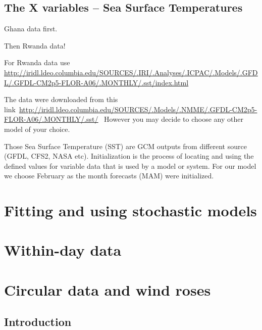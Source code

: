 \documentclass[
  letterpaper,
  DIV=11,
  numbers=noendperiod]{scrreprt}
\begin{document}
\section{The X variables -- Sea Surface
Temperatures}\label{the-x-variables-sea-surface-temperatures}

Ghana data first.

Then Rwanda data!

For Rwanda data use
\href{http://iridl.ldeo.columbia.edu/SOURCES/.IRI/.Analyses/.ICPAC/.Models/.GFDL/.GFDL-CM2p5-FLOR-A06/.MONTHLY/.sst/index.html}{\ul{http://iridl.ldeo.columbia.edu/SOURCES/.IRI/.Analyses/.ICPAC/.Models/.GFDL/.GFDL-CM2p5-FLOR-A06/.MONTHLY/.sst/index.html}}

The data were downloaded from this
link~\href{http://iridl.ldeo.columbia.edu/SOURCES/.Models/.NMME/.GFDL-CM2p5-FLOR-A06/.MONTHLY/.sst/}{\ul{http://iridl.ldeo.columbia.edu/SOURCES/.Models/.NMME/.GFDL-CM2p5-FLOR-A06/.MONTHLY/.sst/}}~
However you may decide to choose any other model of your choice.~~

Those Sea Surface Temperature (SST) are GCM outputs from different
source (GFDL, CFS2, NASA etc). Initialization is the process of locating
and using the defined values for variable data that is used by a model
or system. For our model we choose February as the month forecasts (MAM)
were initialized.


\chapter{Fitting and using stochastic
models}\label{fitting-and-using-stochastic-models}


\chapter{Within-day data}\label{within-day-data}


\chapter{Circular data and wind
roses}\label{circular-data-and-wind-roses}

\section{Introduction}\label{introduction-13}
\end{document}
